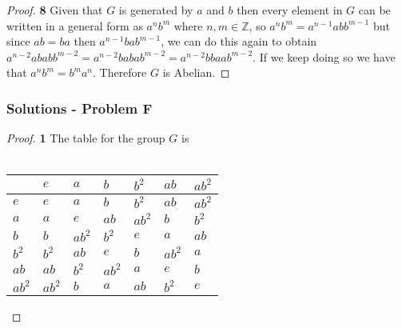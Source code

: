 \documentclass[11pt]{article}
\begin{document}
	\begin{proof}{\textbf{8}}
		Given that $G$ is generated by $a$ and $b$ then every element in $G$ can be written in a general form as $a^{n}b^{m}$ where $n,m \in \mathbb{Z}$, so $a^{n}b^{m}=a^{n-1}abb^{m-1}$ but since $ab=ba$ then $a^{n-1}bab^{m-1}$, we can do this again to obtain $a^{n-2}ababb^{m-2}=a^{n-2}babab^{m-2}=a^{n-2}bbaab^{m-2}$. If we keep doing so we have that $a^{n}b^{m}=b^{m}a^{n}$. Therefore $G$ is Abelian.
	\end{proof}

	\subsubsection*{Solutions - Problem F}
	\begin{proof}{\textbf{1}}
		The table for the group $G$ is\\\\
		\begin{adjustbox}{max width=\textwidth,center}
		\begin{tabular}{l|llllll}
			    & $e$ & $a$ & $b$ & $b^{2}$ & $ab$ & $ab^{2}$ \\ \hline
			$e$ & $e$ & $a$ & $b$ & $b^{2}$ & $ab$ & $ab^{2}$ \\
			$a$ & $a$ & $e$ & $ab$ & $ab^{2}$ & $b$ & $b^{2}$ \\
			$b$ & $b$ & $ab^{2}$ & $b^{2}$ & $e$ & $a$ & $ab$ \\			
			$b^{2}$ & $b^{2}$ & $ab$ & $e$ & $b$ & $ab^{2}$ & $a$ \\
		    $ab$ & $ab$ & $b^{2}$ & $ab^{2}$ & $a$ & $e$ & $b$ \\
	        $ab^{2}$ & $ab^{2}$ & $b$ & $a$ & $ab$ & $b^{2}$ & $e$
		\end{tabular}
		\end{adjustbox}
	\end{proof}
\end{document}
